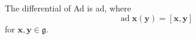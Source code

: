 The differential of Ad is ad, where
$$\operatorname{ad} \mathbf{x}(\mathbf{y}) = [\mathbf{x}, \mathbf{y}]$$
for $\mathbf{x}, \mathbf{y} \in \mathfrak{g}$.
